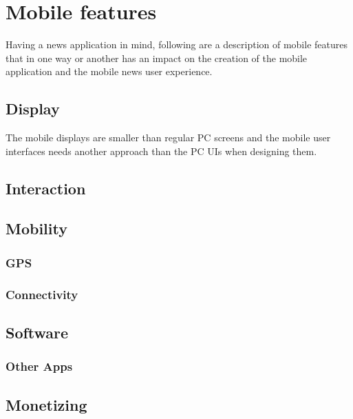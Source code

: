 \chapter{Mobile features}
Having a news application in mind, following are a description of mobile features that in one way or another has an impact on the creation of the mobile application and the mobile news user experience.

\section{Display}
The mobile displays are smaller than regular PC screens and the mobile user interfaces needs another approach than the PC UIs when designing them. 

\section{Interaction}


\section{Mobility}

\subsection{GPS}

\subsection{Connectivity}


\section{Software}

\subsection{Other Apps}


\section{Monetizing}